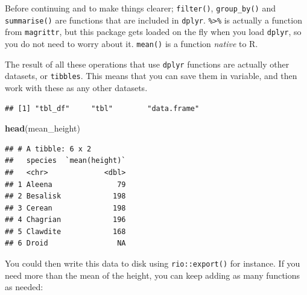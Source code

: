 \documentclass[]{gitbook}
\newenvironment{Shaded}{\begin{snugshade}}{\end{snugshade}}
\newcommand{\DataTypeTok}[1]{\textcolor[rgb]{0.13,0.29,0.53}{#1}}
\newcommand{\KeywordTok}[1]{\textcolor[rgb]{0.13,0.29,0.53}{\textbf{#1}}}
\newcommand{\NormalTok}[1]{#1}
\newcommand{\OperatorTok}[1]{\textcolor[rgb]{0.81,0.36,0.00}{\textbf{#1}}}
\newcommand{\StringTok}[1]{\textcolor[rgb]{0.31,0.60,0.02}{#1}}
\theoremstyle{definition}
\theoremstyle{definition}
\theoremstyle{definition}
\theoremstyle{remark}
\begin{document}
Before continuing and to make things clearer; \texttt{filter()},
\texttt{group\_by()} and \texttt{summarise()} are functions that are
included in \texttt{dplyr}. \texttt{\%\textgreater{}\%} is actually a
function from \texttt{magrittr}, but this package gets loaded on the fly
when you load \texttt{dplyr}, so you do not need to worry about it.
\texttt{mean()} is a function \emph{native} to R.

The result of all these operations that use \texttt{dplyr} functions are
actually other datasets, or \texttt{tibbles}. This means that you can
save them in variable, and then work with these as any other datasets.

\begin{Shaded}
\end{Shaded}

\begin{verbatim}
## [1] "tbl_df"     "tbl"        "data.frame"
\end{verbatim}

\begin{Shaded}
\begin{Highlighting}[]
\KeywordTok{head}\NormalTok{(mean_height)}
\end{Highlighting}
\end{Shaded}

\begin{verbatim}
## # A tibble: 6 x 2
##   species  `mean(height)`
##   <chr>             <dbl>
## 1 Aleena               79
## 2 Besalisk            198
## 3 Cerean              198
## 4 Chagrian            196
## 5 Clawdite            168
## 6 Droid                NA
\end{verbatim}

You could then write this data to disk using \texttt{rio::export()} for
instance. If you need more than the mean of the height, you can keep
adding as many functions as needed:

\begin{Shaded}
\end{Shaded}
\end{document}
